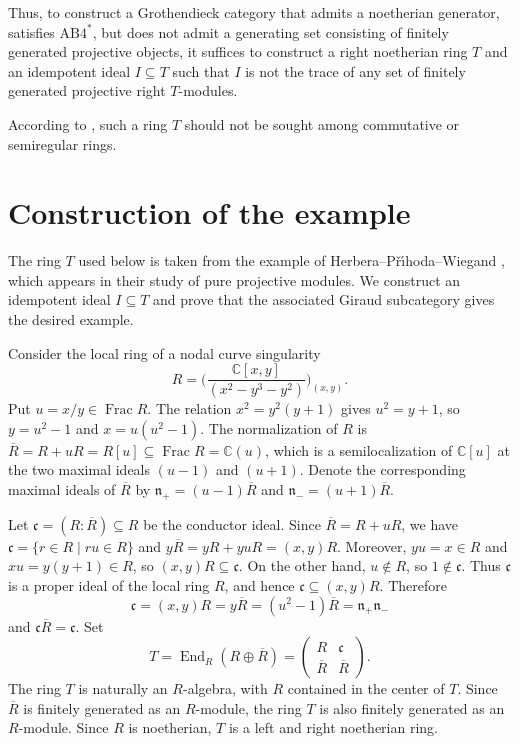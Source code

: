 \documentclass[a4paper,10pt,reqno]{amsart}
\theoremstyle{definition}
\theoremstyle{plain}
\numberwithin{equation}{section}
\newcommand{\bbC}{\mathbb{C}}
\newcommand{\kc}{\mathfrak{c}}
\DeclareMathOperator{\End}{End}
\DeclareMathOperator{\Frac}{Frac}
\newcommand{\ABfourst}{\mathrm{AB4}^{\ast}}
\newcommand{\np}{\mathfrak{n}_{+}}
\newcommand{\nm}{\mathfrak{n}_{-}}
\begin{document}
Thus, to construct a Grothendieck category that admits a noetherian generator, satisfies $\ABfourst$, but does not admit a generating set consisting of finitely generated projective objects, it suffices to construct a right noetherian ring $T$ and an idempotent ideal $I\subseteq T$ such that $I$ is not the trace of any set of finitely generated projective right $T$-modules.

According to \cite[Theorems~6.1 and~6.4]{arXiv:2508.00670v2}, such a ring $T$ should not be sought among commutative or semiregular rings.

\section{Construction of the example}
\label{36821497}

The ring $T$ used below is taken from the example of Herbera--P\v{r}\'{\i}hoda--Wiegand \cite[Section~8]{MR4915561}, which appears in their study of pure projective modules. We construct an idempotent ideal $I\subseteq T$ and prove that the associated Giraud subcategory gives the desired example.

Consider the local ring of a nodal curve singularity
\begin{equation*}
R=
\biggl(
\dfrac{\bbC[x,y]}{(x^{2}-y^{3}-y^{2})}
\biggr)_{(x,y)}.
\end{equation*}
Put $u=x/y\in\Frac R$. The relation $x^{2}=y^{2}(y+1)$ gives $u^{2}=y+1$, so $y=u^{2}-1$ and $x=u(u^{2}-1)$. The normalization of $R$ is $\overline{R}=R+uR=R[u]\subseteq\Frac R=\bbC(u)$, which is a semilocalization of $\bbC[u]$ at the two maximal ideals $(u-1)$ and $(u+1)$. Denote the corresponding maximal ideals of $\overline{R}$ by $\np=(u-1)\overline{R}$ and $\nm=(u+1)\overline{R}$.

Let $\kc=(R:\overline{R})\subseteq R$ be the conductor ideal. Since $\overline{R}=R+uR$, we have $\kc=\{r\in R\mid ru\in R\}$ and $y\overline{R}=yR+yuR=(x,y)R$. Moreover, $yu=x\in R$ and $xu=y(y+1)\in R$, so $(x,y)R\subseteq\kc$. On the other hand, $u\notin R$, so $1\notin\kc$. Thus $\kc$ is a proper ideal of the local ring $R$, and hence $\kc\subseteq(x,y)R$. Therefore
\begin{equation*}
\kc=(x,y)R=y\overline{R}=(u^{2}-1)\overline{R}=\np\nm
\end{equation*}
and $\kc\overline{R}=\kc$. Set
\begin{equation*}
T=\End_{R}(R\oplus\overline{R})=
\begin{pmatrix}
R & \kc\\
\overline{R} & \overline{R}
\end{pmatrix}.
\end{equation*}
The ring $T$ is naturally an $R$-algebra, with $R$ contained in the center of $T$. Since $\overline{R}$ is finitely generated as an $R$-module, the ring $T$ is also finitely generated as an $R$-module. Since $R$ is noetherian, $T$ is a left and right noetherian ring.
\end{document}
